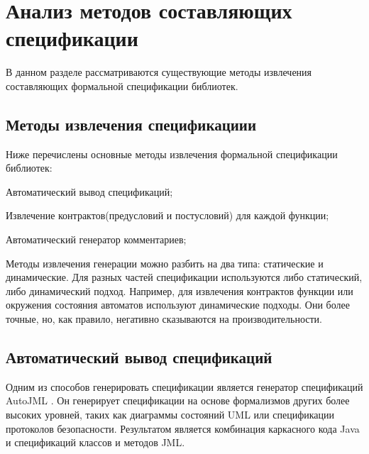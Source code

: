 \chapter{Анализ методов составляющих спецификации}

В данном разделе рассматриваются существующие методы извлечения составляющих формальной спецификации библиотек.

\section{Методы извлечения спецификациии}

Ниже перечислены основные методы извлечения формальной спецификации библиотек:
%
\begin{itemize*}
\item Автоматический вывод спецификаций;
\item Извлечение контрактов(предусловий и постусловий) для каждой функции;
\item Автоматический генератор комментариев;
\end{itemize*}
%

Методы извлечения генерации можно разбить на два типа: статические и динамические.
Для разных частей спецификации используются либо статический, либо динамический подход.
Например, для извлечения контрактов функции или окружения состояния автоматов используют динамические подходы. Они более точные, но, как правило, негативно сказываются на производительности.

\section{Автоматический вывод спецификаций}

Одним из способов генерировать спецификации является генератор спецификаций AutoJML \cite{autoJML_paper} \cite{autoJML}.
Он генерирует спецификации на основе формализмов других более высоких уровней, таких как диаграммы состояний UML или спецификации протоколов безопасности. Результатом является комбинация каркасного кода Java и спецификаций классов и методов JML.

